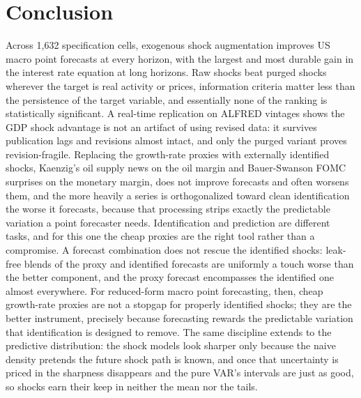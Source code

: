 \documentclass[conference]{IEEEtran}
\begin{document}
\section{Conclusion}
Across 1{,}632 specification cells, exogenous shock augmentation improves US macro point forecasts at every horizon, with the largest and most durable gain in the interest rate equation at long horizons. Raw shocks beat purged shocks wherever the target is real activity or prices, information criteria matter less than the persistence of the target variable, and essentially none of the ranking is statistically significant. A real-time replication on ALFRED vintages shows the GDP shock advantage is not an artifact of using revised data: it survives publication lags and revisions almost intact, and only the purged variant proves revision-fragile. Replacing the growth-rate proxies with externally identified shocks, Kaenzig's oil supply news on the oil margin and Bauer-Swanson FOMC surprises on the monetary margin, does not improve forecasts and often worsens them, and the more heavily a series is orthogonalized toward clean identification the worse it forecasts, because that processing strips exactly the predictable variation a point forecaster needs. Identification and prediction are different tasks, and for this one the cheap proxies are the right tool rather than a compromise. A forecast combination does not rescue the identified shocks: leak-free blends of the proxy and identified forecasts are uniformly a touch worse than the better component, and the proxy forecast encompasses the identified one almost everywhere. For reduced-form macro point forecasting, then, cheap growth-rate proxies are not a stopgap for properly identified shocks; they are the better instrument, precisely because forecasting rewards the predictable variation that identification is designed to remove. The same discipline extends to the predictive distribution: the shock models look sharper only because the naive density pretends the future shock path is known, and once that uncertainty is priced in the sharpness disappears and the pure VAR's intervals are just as good, so shocks earn their keep in neither the mean nor the tails.
\end{document}
